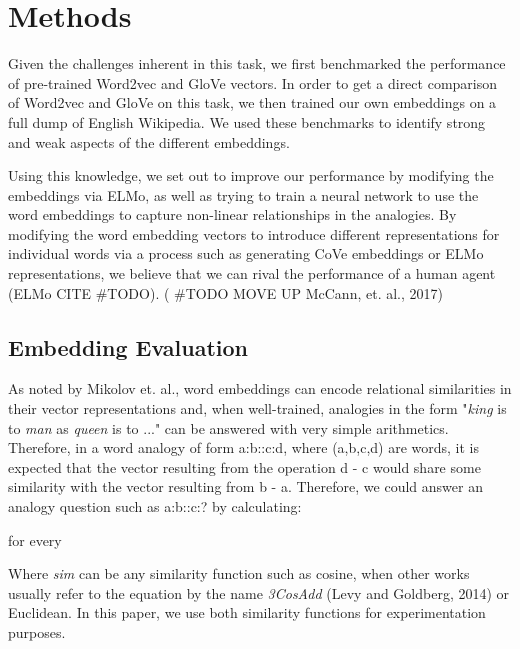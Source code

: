 \documentclass[11pt]{article}
\begin{document}
\section{Methods}

Given the challenges inherent in this task, we first benchmarked the
performance of pre-trained Word2vec and GloVe vectors. In order to get a
direct comparison of Word2vec and GloVe on this task, we then trained
our own embeddings on a full dump of English Wikipedia. We used these
benchmarks to identify strong and weak aspects of the different
embeddings.

Using this knowledge, we set out to improve our performance by modifying
the embeddings via ELMo, as well as trying to train a neural network to
use the word embeddings to capture non-linear relationships in the
analogies. By modifying the word embedding vectors to introduce
different representations for individual words via a process such as
generating CoVe embeddings or ELMo representations, we believe that we
can rival the performance of a human agent (ELMo CITE \#TODO). ( \#TODO
MOVE UP McCann, et. al., 2017)

\subsection{Embedding Evaluation}

As noted by Mikolov et. al., word embeddings can encode relational
similarities in their vector representations and, when well-trained,
analogies in the form "\emph{king }is to \emph{man }as \emph{queen} is
to ..." can be answered with very simple arithmetics. Therefore, in a
word analogy of form a:b::c:d, where (a,b,c,d) are words, it is expected
that the vector resulting from the operation d - c would share some
similarity with the vector resulting from b - a. Therefore, we could answer an analogy question such as a:b::c:?
by calculating:

for every

Where \emph{sim }can be any similarity function such as cosine, when
other works usually refer to the equation by the name \emph{3CosAdd}
(Levy and Goldberg, 2014) or Euclidean. In this paper, we use both
similarity functions for experimentation purposes.
\end{document}
